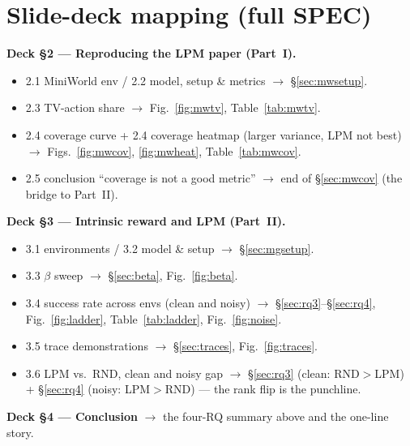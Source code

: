 \documentclass[11pt]{article}
\begin{document}
\section*{Slide-deck mapping (full SPEC)}
\textbf{Deck \S2 --- Reproducing the LPM paper (Part~I).}
\begin{itemize}[leftmargin=2em,itemsep=1pt]
\item 2.1 MiniWorld env / 2.2 model, setup \& metrics $\to$ \S\ref{sec:mwsetup}.
\item 2.3 TV-action share $\to$ Fig.~\ref{fig:mwtv}, Table~\ref{tab:mwtv}.
\item 2.4 coverage curve + 2.4 coverage heatmap (larger variance, LPM not best) $\to$
Figs.~\ref{fig:mwcov}, \ref{fig:mwheat}, Table~\ref{tab:mwcov}.
\item 2.5 conclusion ``coverage is not a good metric'' $\to$ end of \S\ref{sec:mwcov} (the bridge to Part~II).
\end{itemize}
\textbf{Deck \S3 --- Intrinsic reward and LPM (Part~II).}
\begin{itemize}[leftmargin=2em,itemsep=1pt]
\item 3.1 environments / 3.2 model \& setup $\to$ \S\ref{sec:mgsetup}.
\item 3.3 $\beta$ sweep $\to$ \S\ref{sec:beta}, Fig.~\ref{fig:beta}.
\item 3.4 success rate across envs (clean and noisy) $\to$ \S\ref{sec:rq3}--\S\ref{sec:rq4},
Fig.~\ref{fig:ladder}, Table~\ref{tab:ladder}, Fig.~\ref{fig:noise}.
\item 3.5 trace demonstrations $\to$ \S\ref{sec:traces}, Fig.~\ref{fig:traces}.
\item 3.6 LPM vs.\ RND, clean and noisy gap $\to$ \S\ref{sec:rq3} (clean: RND$>$LPM) +
\S\ref{sec:rq4} (noisy: LPM$>$RND) --- the rank flip is the punchline.
\end{itemize}
\textbf{Deck \S4 --- Conclusion} $\to$ the four-RQ summary above and the one-line story.

\appendix
\end{document}
